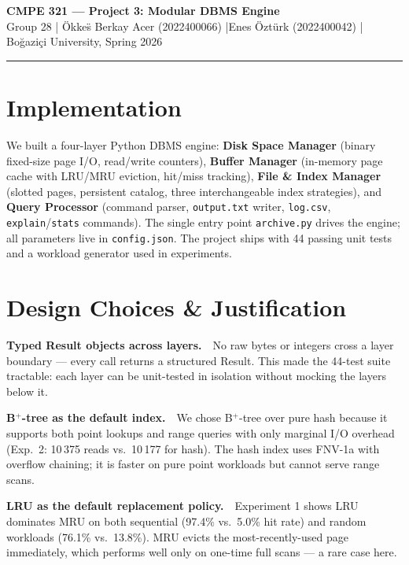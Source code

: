 \documentclass[11pt]{article}
\begin{document}
\begin{center}
    {\large\bfseries CMPE 321 — Project 3: Modular DBMS Engine}\\[3pt]
    {\small Group 28 \quad|\quad
     \"{O}kke\"{s} Berkay Acer (2022400066) \quad|\quad Enes \"{O}zt\"{u}rk (2022400042) \quad|\quad
     Bo\u{g}azi\c{c}i University, Spring 2026}
\end{center}
\vspace{-2pt}\hrule\vspace{4pt}

\section{Implementation}

We built a four-layer Python DBMS engine: \textbf{Disk Space Manager} (binary
fixed-size page I/O, read/write counters), \textbf{Buffer Manager} (in-memory
page cache with LRU/MRU eviction, hit/miss tracking), \textbf{File \& Index
Manager} (slotted pages, persistent catalog, three interchangeable index
strategies), and \textbf{Query Processor} (command parser, \texttt{output.txt}
writer, \texttt{log.csv}, \texttt{explain}/\texttt{stats} commands). The
single entry point \texttt{archive.py} drives the engine; all parameters live
in \texttt{config.json}. The project ships with 44 passing unit tests and a
workload generator used in experiments.

\section{Design Choices \& Justification}

\textbf{Typed Result objects across layers.}\ \ No raw bytes or integers cross
a layer boundary — every call returns a structured Result. This made the 44-test
suite tractable: each layer can be unit-tested in isolation without mocking
the layers below it.

\textbf{B$^+$-tree as the default index.}\ \ We chose B$^+$-tree over pure hash
because it supports both point lookups and range queries with only marginal I/O
overhead (Exp.\ 2: 10\,375 reads vs.\ 10\,177 for hash). The hash index uses
FNV-1a with overflow chaining; it is faster on pure point workloads but cannot
serve range scans.

\textbf{LRU as the default replacement policy.}\ \ Experiment 1 shows LRU
dominates MRU on both sequential (97.4\% vs.\ 5.0\% hit rate) and random
workloads (76.1\% vs.\ 13.8\%). MRU evicts the most-recently-used page
immediately, which performs well only on one-time full scans — a rare case here.
\end{document}
